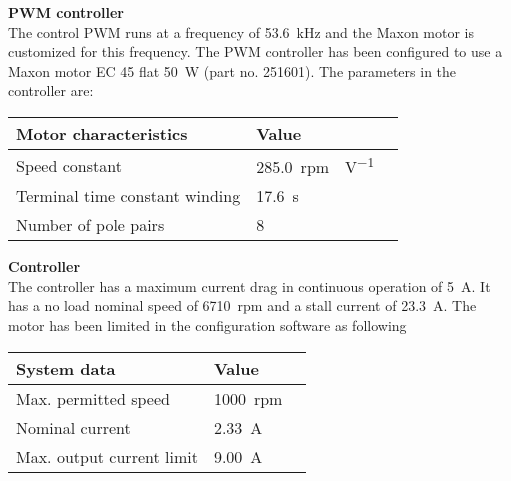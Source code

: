 \textbf{PWM controller}\\
The control PWM runs at a frequency of \SI{53,6}{kHz} and the Maxon motor is customized for this frequency.
The PWM controller has been configured to use a Maxon motor EC 45 flat \SI{50}{W} (part no. 251601). The parameters in the controller are:
\begin{table}[H]
	\centering
	\begin{tabular}{|l|l|p{4.3cm}|}
		\hline%
		\textbf{Motor characteristics}       &  \textbf{Value}         \\
		\hline%
		Speed constant                                & \SI{285,0}{rpm\cdot V^{-1}}           \\
		\hline%
		Terminal time constant winding							  & \SI{17,6}{s}              \\
		\hline%
		Number of pole pairs							  & 8              \\
		\hline%
	\end{tabular}
\end{table}

\textbf{Controller}\\
The controller has a maximum current drag in continuous operation of \SI{5}{A}. It has a no load nominal speed of \SI{6710}{rpm} and a stall current of \SI{23,3}{A}. The motor has been limited in the configuration software as following
\begin{table}[H]
	\centering
	\begin{tabular}{|l|l|p{4.3cm}|}
		\hline%
		\textbf{System data}       &  \textbf{Value}         \\
		\hline%
		Max. permitted speed                                & \SI{1000}{rpm}           \\
		\hline%
		Nominal current							  & \SI{2,33}{A}              \\
		\hline%
		Max. output current limit							  & \SI{9,00}{A}              \\
		\hline%
	\end{tabular}
\end{table}


